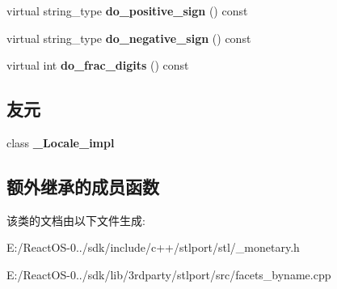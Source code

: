 \begin{DoxyCompactItemize}
\item 
\mbox{\label{classmoneypunct__byname_3_01wchar__t_00_01true_01_4_a8bdf1d79de90aac634b33a8f08ed8d95}} 
virtual string\+\_\+type {\bfseries do\+\_\+positive\+\_\+sign} () const
\item 
\mbox{\label{classmoneypunct__byname_3_01wchar__t_00_01true_01_4_ab914fe9103d2bc3319f43965a56563a5}} 
virtual string\+\_\+type {\bfseries do\+\_\+negative\+\_\+sign} () const
\item 
\mbox{\label{classmoneypunct__byname_3_01wchar__t_00_01true_01_4_a561519c5aa781cd060cec4951ad2b8b1}} 
virtual int {\bfseries do\+\_\+frac\+\_\+digits} () const
\end{DoxyCompactItemize}
\subsection*{友元}
\begin{DoxyCompactItemize}
\item 
\mbox{\label{classmoneypunct__byname_3_01wchar__t_00_01true_01_4_ae9c09ac7cd16ad35f8fdb1587ac77eb8}} 
class {\bfseries \+\_\+\+Locale\+\_\+impl}
\end{DoxyCompactItemize}
\subsection*{额外继承的成员函数}


该类的文档由以下文件生成\+:\begin{DoxyCompactItemize}
\item 
E\+:/\+React\+O\+S-\/0../sdk/include/c++/stlport/stl/\+\_\+monetary.\+h\item 
E\+:/\+React\+O\+S-\/0../sdk/lib/3rdparty/stlport/src/facets\+\_\+byname.\+cpp\end{DoxyCompactItemize}
